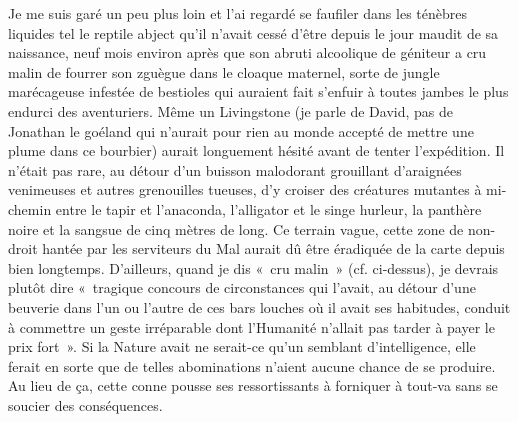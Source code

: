 Je me suis garé un peu plus loin et l’ai regardé se faufiler dans les ténèbres liquides tel le reptile abject qu’il n’avait cessé d’être depuis le jour maudit de sa naissance, neuf mois environ après que son abruti alcoolique de géniteur a cru malin de fourrer son zguègue dans le cloaque maternel, sorte de jungle marécageuse infestée de bestioles qui auraient fait s’enfuir à toutes jambes le plus endurci des aventuriers. Même un Livingstone (je \illusloflabel{}parle de David, pas de Jonathan le goéland qui n’aurait pour rien au monde accepté de mettre une plume dans ce bourbier) aurait longuement hésité avant de tenter l’expédition. Il n’était pas rare, au détour d’un buisson malodorant grouillant d’araignées venimeuses et autres grenouilles tueuses, d’y croiser des créatures mutantes à mi-chemin entre le tapir et l’anaconda, l’alligator et le singe hurleur, la panthère noire et la sangsue de cinq mètres de long. Ce terrain vague, cette zone de non-droit hantée par les serviteurs du Mal aurait dû être éradiquée de la carte depuis bien longtemps. D’ailleurs, quand je dis «~cru malin~» (cf. ci-dessus), je devrais plutôt dire «~tragique concours de circonstances qui l’avait, au détour d’une beuverie dans l’un ou l’autre de ces bars louches où il avait ses habitudes, conduit à commettre un geste irréparable dont l’Humanité n’allait pas tarder à payer le prix fort~». \label{rat:4}Si la Nature avait ne serait-ce qu’un semblant d’intelligence, elle ferait en sorte que de telles abominations n’aient aucune chance de se produire. Au lieu de ça, cette conne pousse ses ressortissants à forniquer à tout-va sans se soucier des conséquences.


